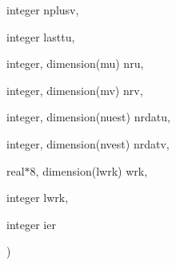 {\begin{DoxyParamCaption}
\item[{integer}]{nplusv, }
\item[{integer}]{lasttu, }
\item[{integer, dimension(mu)}]{nru, }
\item[{integer, dimension(mv)}]{nrv, }
\item[{integer, dimension(nuest)}]{nrdatu, }
\item[{integer, dimension(nvest)}]{nrdatv, }
\item[{real$\ast$8, dimension(lwrk)}]{wrk, }
\item[{integer}]{lwrk, }
\item[{integer}]{ier}
\end{DoxyParamCaption}
)}\label{fppogr_8f_a5f96c0313a718d376f4fd8247e7745eb}
